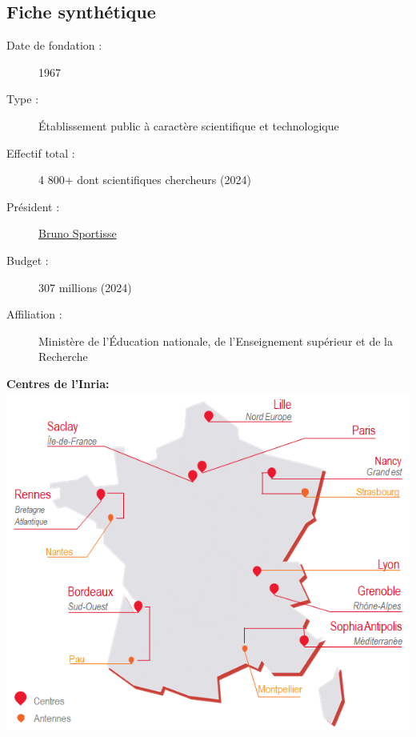 \documentclass[12pt, letterpaper]{article}
\begin{document}
\subsection{Fiche synthétique}
\begin{center}

\begin{minipage}[t]{0.55\textwidth}
    \begin{description}
        \item[Date de fondation :] 1967
        \item[Type :] Établissement public à caractère scientifique et technologique
        \item[Effectif total :] 4 800+ dont scientifiques chercheurs \tiny(2024)\normalsize
        \item[Président :] \href{https://fr.wikipedia.org/wiki/Bruno_Sportisse}{Bruno Sportisse}
        \item[Budget :] 307 millions \tiny(2024)\normalsize
        \item[Affiliation :] Ministère de l'Éducation nationale, de l'Enseignement supérieur et de la Recherche
    \end{description}
\end{minipage}
\hfill
\begin{minipage}[t]{0.4\textwidth}
    \textbf{Centres de l'Inria:}\\[0.5em]
    \includegraphics[width=\textwidth]{centres}
\end{minipage}

\end{center}
\end{document}
